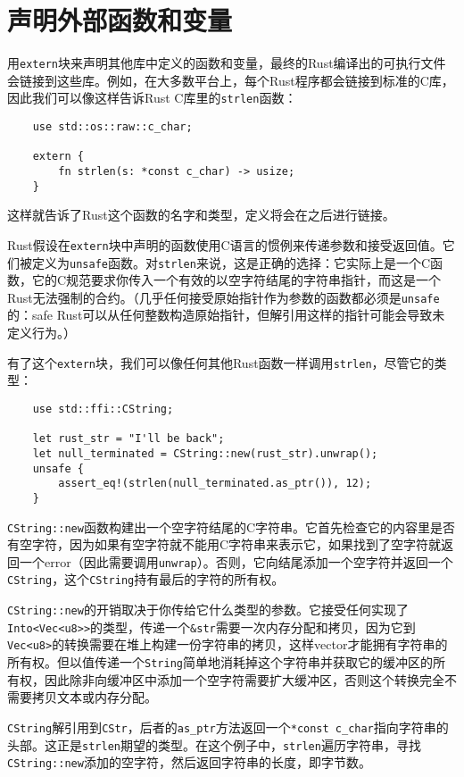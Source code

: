 \section{声明外部函数和变量}
用\texttt{extern}块来声明其他库中定义的函数和变量，最终的Rust编译出的可执行文件会链接到这些库。例如，在大多数平台上，每个Rust程序都会链接到标准的C库，因此我们可以像这样告诉Rust C库里的\texttt{strlen}函数：
\begin{verbatim}
    use std::os::raw::c_char;

    extern {
        fn strlen(s: *const c_char) -> usize;
    }
\end{verbatim}

这样就告诉了Rust这个函数的名字和类型，定义将会在之后进行链接。

Rust假设在\texttt{extern}块中声明的函数使用C语言的惯例来传递参数和接受返回值。它们被定义为\texttt{unsafe}函数。对\texttt{strlen}来说，这是正确的选择：它实际上是一个C函数，它的C规范要求你传入一个有效的以空字符结尾的字符串指针，而这是一个Rust无法强制的合约。（几乎任何接受原始指针作为参数的函数都必须是\texttt{unsafe}的：safe Rust可以从任何整数构造原始指针，但解引用这样的指针可能会导致未定义行为。）

有了这个\texttt{extern}块，我们可以像任何其他Rust函数一样调用\texttt{strlen}，尽管它的类型：
\begin{verbatim}
    use std::ffi::CString;

    let rust_str = "I'll be back";
    let null_terminated = CString::new(rust_str).unwrap();
    unsafe {
        assert_eq!(strlen(null_terminated.as_ptr()), 12);
    }
\end{verbatim}

\texttt{CString::new}函数构建出一个空字符结尾的C字符串。它首先检查它的内容里是否有空字符，因为如果有空字符就不能用C字符串来表示它，如果找到了空字符就返回一个error（因此需要调用\texttt{unwrap}）。否则，它向结尾添加一个空字符并返回一个\texttt{CString}，这个\texttt{CString}持有最后的字符的所有权。

\texttt{CString::new}的开销取决于你传给它什么类型的参数。它接受任何实现了\texttt{Into<Vec<u8>>}的类型，传递一个\texttt{\&str}需要一次内存分配和拷贝，因为它到\texttt{Vec<u8>}的转换需要在堆上构建一份字符串的拷贝，这样vector才能拥有字符串的所有权。但以值传递一个\texttt{String}简单地消耗掉这个字符串并获取它的缓冲区的所有权，因此除非向缓冲区中添加一个空字符需要扩大缓冲区，否则这个转换完全不需要拷贝文本或内存分配。

\texttt{CString}解引用到\texttt{CStr}，后者的\texttt{as\_ptr}方法返回一个\texttt{*const c\_char}指向字符串的头部。这正是\texttt{strlen}期望的类型。在这个例子中，\texttt{strlen}遍历字符串，寻找\texttt{CString::new}添加的空字符，然后返回字符串的长度，即字节数。

